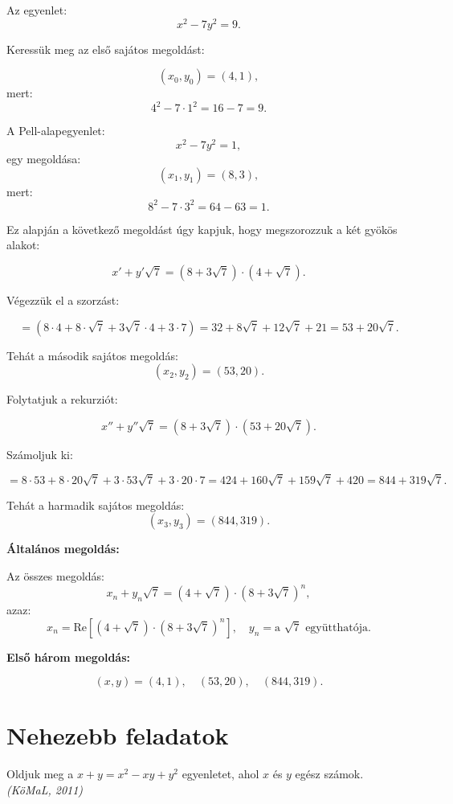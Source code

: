 \begin{solution}
Az egyenlet: 
\[
x^{2}-7y^{2}=9.
\]

Keressük meg az első sajátos megoldást:

\[
(x_{0},y_{0})=(4,1),
\]
mert: 
\[
4^{2}-7\cdot1^{2}=16-7=9.
\]

A Pell-alapegyenlet: 
\[
x^{2}-7y^{2}=1,
\]
egy megoldása: 
\[
(x_{1},y_{1})=(8,3),
\]
mert: 
\[
8^{2}-7\cdot3^{2}=64-63=1.
\]

Ez alapján a következő megoldást úgy kapjuk, hogy megszorozzuk a két
gyökös alakot:

\[
x'+y'\sqrt{7}=(8+3\sqrt{7})\cdot(4+\sqrt{7}).
\]

Végezzük el a szorzást:

\[
=(8\cdot4+8\cdot\sqrt{7}+3\sqrt{7}\cdot4+3\cdot7)=32+8\sqrt{7}+12\sqrt{7}+21=53+20\sqrt{7}.
\]

Tehát a második sajátos megoldás: 
\[
(x_{2},y_{2})=(53,20).
\]

Folytatjuk a rekurziót:

\[
x''+y''\sqrt{7}=(8+3\sqrt{7})\cdot(53+20\sqrt{7}).
\]

Számoljuk ki:

\[
=8\cdot53+8\cdot20\sqrt{7}+3\cdot53\sqrt{7}+3\cdot20\cdot7=424+160\sqrt{7}+159\sqrt{7}+420=844+319\sqrt{7}.
\]

Tehát a harmadik sajátos megoldás: 
\[
(x_{3},y_{3})=(844,319).
\]

\bigskip{}

\textbf{Általános megoldás:}

Az összes megoldás: 
\[
x_{n}+y_{n}\sqrt{7}=(4+\sqrt{7})\cdot(8+3\sqrt{7})^{n},
\]
azaz: 
\[
x_{n}=\text{Re}\left[(4+\sqrt{7})\cdot(8+3\sqrt{7})^{n}\right],\quad y_{n}=\text{a }\sqrt{7}\text{ együtthatója}.
\]

\bigskip{}

\textbf{Első három megoldás:}

\[
(x,y)=(4,1),\quad(53,20),\quad(844,319).
\]
\end{solution}

\section*{Nehezebb feladatok}
\begin{extraproblem}
Oldjuk meg a $x+y=x^{2}-xy+y^{2}$ egyenletet, ahol $x$ és $y$
egész számok. \emph{(KöMaL, 2011) }
\end{extraproblem}


